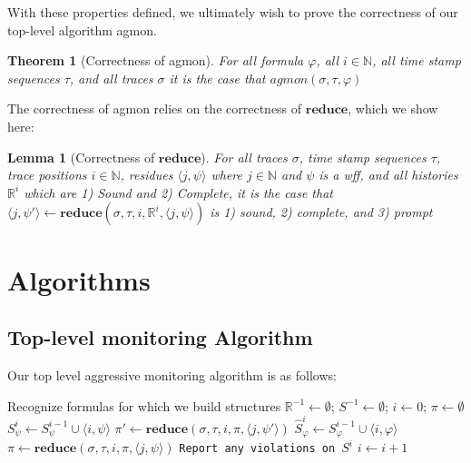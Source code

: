 \documentclass[10pt,a4paper]{article}
\newcommand{\rp}[2]{\ensuremath{\langle #1, #2 \rangle}}
\newtheorem{thm}{Theorem}
\newtheorem{lemma}{Lemma}
\begin{document}
With these properties defined, we ultimately wish to prove the correctness of our top-level algorithm agmon.

\begin{thm}[Correctness of agmon]
For all formula $\varphi$, all $i \in \mathbb{N}$, all time stamp sequences $\tau$, and all traces $\sigma$ it is the case that $agmon(\sigma, \tau, \varphi)$
\end{thm}

The correctness of agmon relies on the correctness of $\mathbf{reduce}$, which we show here:
\begin{lemma}[Correctness of $\mathbf{reduce}$]
For all traces $\sigma$, time stamp sequences $\tau$, trace positions $i \in \mathbb{N}$, residues $\rp{j}{\psi}$ where $j \in \mathbb{N}$ and $\psi$ is a wff, and all histories $\mathbb{R}^i$ which are 1) Sound and 2) Complete,
%
it is the case that $\rp{j}{\psi'} \leftarrow \mathbf{reduce}(\sigma,\tau,i,\mathbb{R}^i, \rp{j}{\psi})$ is 1) sound, 2) complete, and 3) prompt


\end{lemma}

\section{Algorithms}
\subsection{Top-level monitoring Algorithm}
Our top level aggressive monitoring algorithm is as follows:


\begin{algorithmic}[1]
\STATE Recognize formulas for which we build structures
\STATE $\mathbb{R}^{-1} \leftarrow \emptyset$; \quad $S^{-1} \leftarrow \emptyset$; \quad $i \leftarrow 0$; \quad $\pi \leftarrow \emptyset$
\LOOP
{}
	\STATE $S^i_{\psi} \leftarrow S^{i-1}_{\psi} \cup \rp{i}{\psi}$
	\FOR{all $\rp{j}{\psi'} \in S^i_{\psi}$}
		\STATE $\pi' \leftarrow \mathbf{reduce}(\sigma, \tau, i, \pi, \rp{j}{\psi'})$
	\ENDFOR
\ENDFOR
\STATE $\hat{S}_{\varphi}^i \leftarrow S_{\varphi}^{i-1} \cup \rp{i}{\varphi}$
\FOR{all $\rp{j}{\psi} \in \hat{S}_{\varphi}^i$}
	\STATE $\pi \leftarrow \mathbf{reduce}(\sigma, \tau, i, \pi, \rp{j}{\psi})$
\ENDFOR
\STATE \texttt{Report any violations on $S^i$}
\STATE $i \leftarrow i + 1$
\ENDLOOP
\end{algorithmic}
\end{document}
